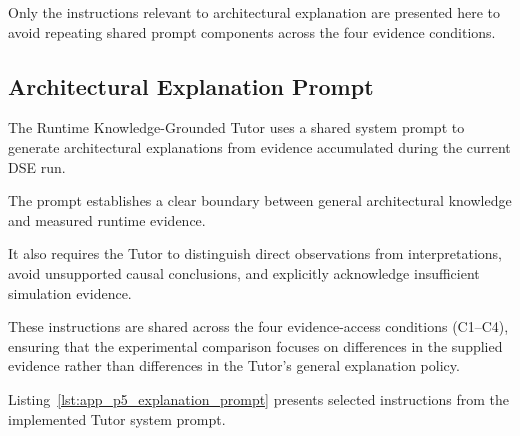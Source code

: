 Only the instructions relevant
to architectural explanation
are presented here to avoid
repeating shared prompt components
across the four evidence conditions.


\subsection{Architectural Explanation Prompt}
\label{app:p5_explanation_prompt}

The Runtime Knowledge-Grounded Tutor
uses a shared system prompt to generate
architectural explanations from evidence
accumulated during the current DSE run.

The prompt establishes a clear boundary
between general architectural knowledge
and measured runtime evidence.

It also requires the Tutor to distinguish
direct observations from interpretations,
avoid unsupported causal conclusions,
and explicitly acknowledge insufficient
simulation evidence.

These instructions are shared across
the four evidence-access conditions
(C1--C4), ensuring that the experimental
comparison focuses on differences in
the supplied evidence rather than
differences in the Tutor's general
explanation policy.

Listing~\ref{lst:app_p5_explanation_prompt}
presents selected instructions from
the implemented Tutor system prompt.

